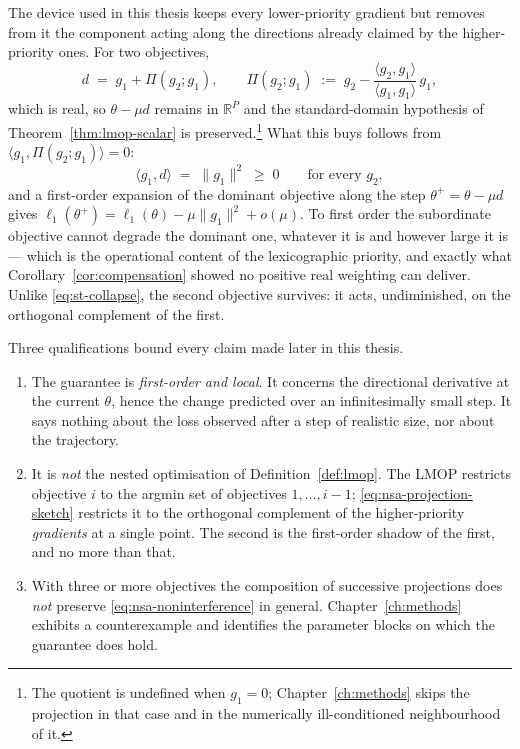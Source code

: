 The device used in this thesis keeps every lower-priority gradient but removes from
it the component acting along the directions already claimed by the higher-priority
ones. For two objectives,
\begin{equation}
  \label{eq:nsa-projection-sketch}
  d \;=\; g_1 + \Pi(g_2;g_1),
  \qquad
  \Pi(g_2;g_1) \;:=\; g_2 - \frac{\langle g_2,g_1\rangle}{\langle g_1,g_1\rangle}\,g_1 ,
\end{equation}
which is real, so $\theta - \mu d$ remains in $\mathbb{R}^{P}$ and the standard-domain
hypothesis of Theorem~\ref{thm:lmop-scalar} is preserved.\footnote{The quotient is
undefined when $g_1=0$; Chapter~\ref{ch:methods} skips the projection in that case
and in the numerically ill-conditioned neighbourhood of it.} What this buys follows
from $\langle g_1, \Pi(g_2;g_1)\rangle = 0$:
\begin{equation}
  \label{eq:nsa-noninterference}
  \langle g_1, d \rangle \;=\; \lVert g_1 \rVert^{2} \;\ge\; 0
  \qquad \text{for every } g_2 ,
\end{equation}
and a first-order expansion of the dominant objective along the step
$\theta^{+} = \theta - \mu d$ gives
$\ell_1(\theta^{+}) = \ell_1(\theta) - \mu\lVert g_1\rVert^{2} + o(\mu)$. To first
order the subordinate objective cannot degrade the dominant one, whatever it is and
however large it is --- which is the operational content of the lexicographic
priority, and exactly what Corollary~\ref{cor:compensation} showed no positive real
weighting can deliver. Unlike \eqref{eq:st-collapse}, the second objective survives:
it acts, undiminished, on the orthogonal complement of the first.

Three qualifications bound every claim made later in this thesis.

\begin{enumerate}
  \item The guarantee is \emph{first-order and local}. It concerns the directional
        derivative at the current $\theta$, hence the change predicted over an
        infinitesimally small step. It says nothing about the loss observed after a
        step of realistic size, nor about the trajectory.
  \item It is \emph{not} the nested optimisation of Definition~\ref{def:lmop}. The
        LMOP restricts objective $i$ to the argmin set of objectives $1,\dots,i-1$;
        \eqref{eq:nsa-projection-sketch} restricts it to the orthogonal complement of
        the higher-priority \emph{gradients} at a single point. The second is the
        first-order shadow of the first, and no more than that.
  \item With three or more objectives the composition of successive projections does
        \emph{not} preserve \eqref{eq:nsa-noninterference} in general.
        Chapter~\ref{ch:methods} exhibits a counterexample and identifies the
        parameter blocks on which the guarantee does hold.
\end{enumerate}

